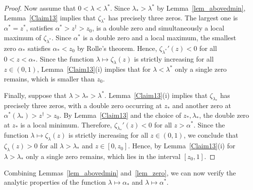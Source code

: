 \documentclass[10pt,reqno]{amsart}
\numberwithin{equation}{section}
\newcommand\Lem{Lemma}
\begin{document}
\begin{proof}
	Now assume that $0<\lambda<\lambda^*$.
	Since $\lambda_*>\lambda^*$ by \Lem~\ref{lem_abovedmin}, \Lem~\ref{Claim13} implies that $\zeta_{\lambda^*}$ has precisely three zeros. 
	The largest one is $\alpha^*=z^*$, satisfies $\alpha^*>z^\dagger>z_0$, is a double zero and simultaneously a local maximum of $\zeta_{\lambda^*}$.
	Since $\alpha^*$ is a double zero and a local maximum, the smallest zero $\alpha_*$ satisfies $\alpha_*<z_0$ by Rolle's theorem.
	Hence, $\zeta_{\lambda^*}'(z)<0$ for all $0<z<\alpha_*$.
	Since the function $\lambda\mapsto\zeta_\lambda(z)$ is strictly increasing for all $z\in(0,1)$, \Lem~\ref{Claim13}(i) implies that for $\lambda<\lambda^*$ only a single zero remains, which is smaller than $z_0$.

	Finally, suppose that $\lambda>\lambda_*>\lambda^*$.
	\Lem~\ref{Claim13}(i) implies that $\zeta_{\lambda_*}$ has precisely three zeros, with a double zero occurring at $z_*$ and another zero at $\alpha^*(\lambda_*)>z^\dagger>z_0$.
	By \Lem~\ref{Claim13} and the choice of $z_*,\lambda_*$, the double zero at $z_*$ is a local minimum.
	Therefore, $\zeta_{\lambda_*}'(z)<0$ for all $z>\alpha^*$.
	Since the function $\lambda\mapsto\zeta_\lambda(z)$ is strictly increasing for all $z\in(0,1)$, we conclude that $\zeta_\lambda(z)>0$ for all $\lambda>\lambda_*$ and $z\in[0,z_0]$.
	Hence, by \Lem~\ref{Claim13}(i) for $\lambda>\lambda_*$ only a single zero remains, which lies in the interval $[z_0,1]$.
\end{proof}

Combining \Lem s~\ref{lem_abovedmin} and~\ref{lem_zero}, we can now verify the analytic properties of the function $\lambda\mapsto\alpha_*$ and $\lambda\mapsto\alpha^*$.
\end{document}
